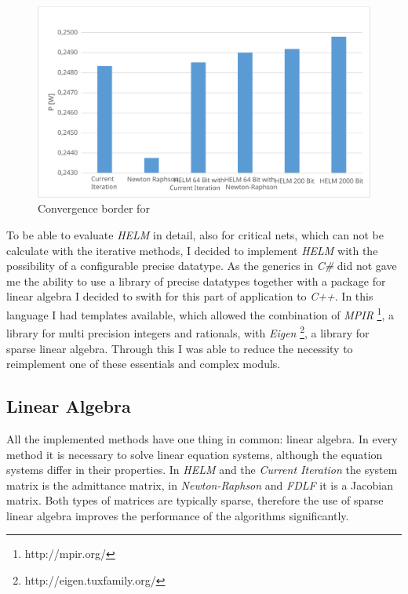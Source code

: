 \begin{figure}
	\centering
	\includegraphics[scale=0.7]{figures/convergence_border}
	\caption{Convergence border for }
	\label{fig:convergence_border}
\end{figure}

To be able to evaluate \emph{HELM} in detail, also for critical nets, which can not be calculate with the iterative methods, I decided to implement \emph{HELM} with the possibility of a configurable precise datatype. As the generics in \emph{C\#} did not gave me the ability to use a library of precise datatypes together with a package for linear algebra I decided to swith for this part of application to \emph{C++}. In this language I had templates available, which allowed the combination of \emph{MPIR} \footnote{http://mpir.org/}, a library for multi precision integers and rationals, with \emph{Eigen} \footnote{http://eigen.tuxfamily.org/}, a library for sparse linear algebra. Through this I was able to reduce the necessity to reimplement one of these essentials and complex moduls.

\subsection{Linear Algebra}
All the implemented methods have one thing in common: linear algebra. In every method it is necessary to solve linear equation systems, although the equation systems differ in their properties. In \emph{HELM} and the \emph{Current Iteration} the system matrix is the admittance matrix, in \emph{Newton-Raphson} and \emph{FDLF} it is a Jacobian matrix. Both types of matrices are typically sparse, therefore the use of sparse linear algebra improves the performance of the algorithms significantly.

